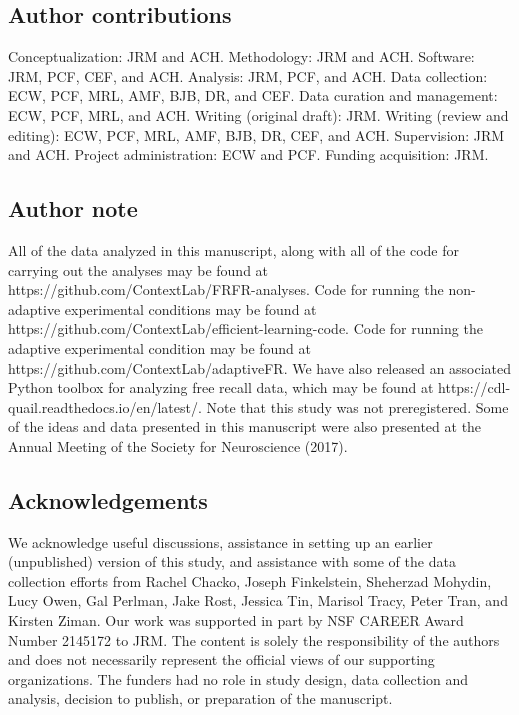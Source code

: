 \documentclass[11pt]{article}
\begin{document}
\subsection*{Author contributions}

Conceptualization: JRM and ACH. Methodology: JRM and ACH. Software: JRM, PCF,
CEF, and ACH. Analysis: JRM, PCF, and ACH. Data collection: ECW, PCF, MRL, AMF,
BJB, DR, and CEF. Data curation and management: ECW, PCF, MRL, and ACH. Writing
(original draft): JRM. Writing (review and editing): ECW, PCF, MRL, AMF, BJB,
DR, CEF, and ACH. Supervision: JRM and ACH. Project administration: ECW and
PCF. Funding acquisition: JRM.

\subsection*{Author note}

All of the data analyzed in this manuscript, along with all of the code for
carrying out the analyses may be found at
https://github.com/ContextLab/FRFR-analyses. Code for running the non-adaptive
experimental conditions may be found at
https://github.com/Con\-text\-Lab/efficient-learning-code. Code for running the
adaptive experimental condition may be found at
https://github.com/ContextLab/adaptiveFR. We have also released an associated
Python toolbox for analyzing free recall data, which may be found at
https://cdl-quail.read\-the\-docs.io/\-en/\-latest/.  Note that this study was not
preregistered.  Some of the ideas and data presented in this manuscript
were also presented at the Annual Meeting of the Society for Neuroscience (2017).

\subsection*{Acknowledgements}

We acknowledge useful discussions, assistance in setting up an earlier
(unpublished) version of this study, and assistance with some of the data
collection efforts from Rachel Chacko, Joseph Finkelstein, Sheherzad Mohydin,
Lucy Owen, Gal Perlman, Jake Rost, Jessica Tin, Marisol Tracy,
Peter Tran, and Kirsten Ziman. Our work was supported in part by NSF CAREER Award Number
2145172 to JRM. The content is solely the responsibility of the authors and
does not necessarily represent the official views of our supporting
organizations. The funders had no role in study design, data collection and
analysis, decision to publish, or preparation of the manuscript.



\end{document}
